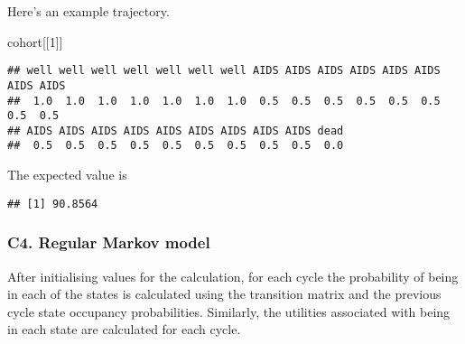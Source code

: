 \documentclass[]{book}
\newenvironment{Shaded}{\begin{snugshade}}{\end{snugshade}}
\newcommand{\DataTypeTok}[1]{\textcolor[rgb]{0.13,0.29,0.53}{#1}}
\newcommand{\DecValTok}[1]{\textcolor[rgb]{0.00,0.00,0.81}{#1}}
\newcommand{\KeywordTok}[1]{\textcolor[rgb]{0.13,0.29,0.53}{\textbf{#1}}}
\newcommand{\NormalTok}[1]{#1}
\newcommand{\OperatorTok}[1]{\textcolor[rgb]{0.81,0.36,0.00}{\textbf{#1}}}
\newcommand{\OtherTok}[1]{\textcolor[rgb]{0.56,0.35,0.01}{#1}}
\newcommand{\StringTok}[1]{\textcolor[rgb]{0.31,0.60,0.02}{#1}}
\begin{document}
Here's an example trajectory.

\begin{Shaded}
\begin{Highlighting}[]
\NormalTok{cohort[[}\DecValTok{1}\NormalTok{]]}
\end{Highlighting}
\end{Shaded}

\begin{verbatim}
## well well well well well well well AIDS AIDS AIDS AIDS AIDS AIDS AIDS AIDS 
##  1.0  1.0  1.0  1.0  1.0  1.0  1.0  0.5  0.5  0.5  0.5  0.5  0.5  0.5  0.5 
## AIDS AIDS AIDS AIDS AIDS AIDS AIDS AIDS AIDS dead 
##  0.5  0.5  0.5  0.5  0.5  0.5  0.5  0.5  0.5  0.0
\end{verbatim}

The expected value is

\begin{Shaded}
\end{Shaded}

\begin{verbatim}
## [1] 90.8564
\end{verbatim}

\hypertarget{c4.-regular-markov-model}{%
\subsubsection{C4. Regular Markov model}\label{c4.-regular-markov-model}}

After initialising values for the calculation, for each cycle the probability of being in each of the states is calculated using the transition matrix and the previous cycle state occupancy probabilities.
Similarly, the utilities associated with being in each state are calculated for each cycle.
\end{document}
